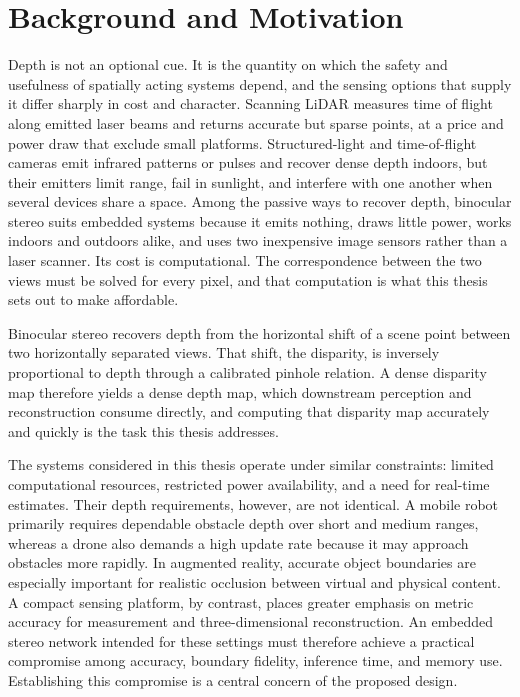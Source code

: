 \section{Background and Motivation}
Depth is not an optional cue. It is the quantity on which the safety and
usefulness of spatially acting systems depend, and the sensing options
that supply it differ sharply in cost and character. Scanning LiDAR
measures time of flight along emitted laser beams and returns accurate but
sparse points, at a price and power draw that exclude small platforms.
Structured-light and time-of-flight cameras emit infrared patterns or
pulses and recover dense depth indoors, but their emitters limit range,
fail in sunlight, and interfere with one another when several devices
share a space. Among the passive ways to recover depth, binocular stereo
suits embedded systems because it emits nothing, draws little power, works
indoors and outdoors alike, and uses two inexpensive image sensors rather
than a laser scanner. Its cost is computational. The correspondence
between the two views must be solved for every pixel, and that computation
is what this thesis sets out to make affordable.

Binocular stereo recovers depth from the horizontal shift of a scene
point between two horizontally separated views. That shift, the
disparity, is inversely proportional to depth through a calibrated
pinhole relation. A dense disparity map
therefore yields a dense depth map, which downstream perception and
reconstruction consume directly, and computing that disparity map
accurately and quickly is the task this thesis addresses.

The systems considered in this thesis operate under similar constraints:
limited computational resources, restricted power availability, and a
need for real-time estimates. Their depth requirements, however, are not
identical. A mobile robot primarily requires dependable obstacle depth
over short and medium ranges, whereas a drone also demands a high update
rate because it may approach obstacles more rapidly. In augmented
reality, accurate object boundaries are especially important for
realistic occlusion between virtual and physical content. A compact
sensing platform, by contrast, places greater emphasis on metric accuracy
for measurement and three-dimensional reconstruction. An embedded stereo
network intended for these settings must therefore achieve a practical
compromise among accuracy, boundary fidelity, inference time, and memory
use. Establishing this compromise is a central concern of the proposed
design.

